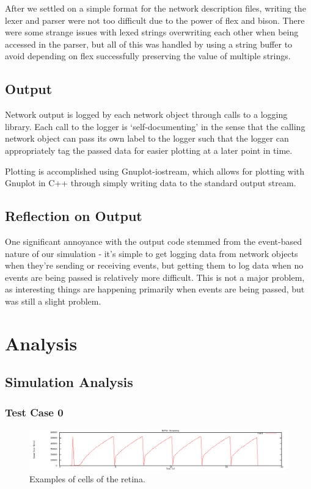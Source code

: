 \documentclass[12pt]{article}
\begin{document}
After we settled on a simple format for the network description files, writing the lexer and parser were not too difficult due to the power of flex and bison. There were some strange issues with lexed strings overwriting each other when being accessed in the parser, but all of this was handled by using a string buffer to avoid depending on flex successfully preserving the value of multiple strings.



\subsection{Output}

Network output is logged by each network object through calls to a logging library. Each call to the logger is ‘self-documenting’ in the sense that the calling network object can pass its own label to the logger such that the logger can appropriately tag the passed data for easier plotting at a later point in time.

Plotting is accomplished using Gnuplot-iostream, which allows for plotting with Gnuplot in C++ through simply writing data to the standard output stream.

\subsection*{Reflection on Output}
One significant annoyance with the output code stemmed from the event-based nature of our simulation - it’s simple to get logging data from network objects when they’re sending or receiving events, but getting them to log data when no events are being passed is relatively more difficult. This is not a major problem, as interesting things are happening primarily when events are being passed, but was still a slight problem.


\section{Analysis}


\subsection{Simulation Analysis}
\subsubsection{Test Case 0}

\begin{figure}[!ht]
\centering \includegraphics[bb= 0 0 1300 250, scale=.35]{figures/Test0_Tahoe/buffer_occ.png}
\caption{Examples of cells of the retina.}
\label{fig:test0_tahoe_buffer_occ}
\end{figure}
\end{document}
